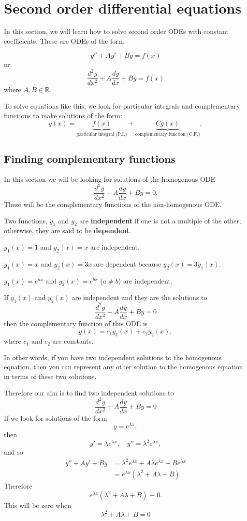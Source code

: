 \section{Second order differential equations}
In this section, we will learn how to solve second order ODEs with constant coefficients. These are ODEs of the form

\[y'' + Ay' + By = f(x)\] or \[\frac{d^2y}{dx^2} + A\frac{dy}{dx} + By = f(x)\] where \(A,B\in\mathbb{R}\).

To solve equations like this, we look for particular integrals and complementary functions to make solutions of the form:
\[y(x)=\underbrace{f(x)}_{\text{particular integral (P.I.)}}+\underbrace{Cg(x)}_{\text{complementary function (C.F.)}},\]

\subsection{Finding complementary functions}
In this section we will be looking for solutions of the homogenous ODE \[\frac{d^2y}{dx^2} + A\frac{dy}{dx} + By = 0.\]
These will be the complementary functions of the non-homogenous ODE.
\begin{definition}
Two functions, $y_1$ and $y_2$ are \textbf{independent} if one is not a multiple of the other; otherwise, they are said to be \textbf{dependent}.
\end{definition}

\begin{example}
$y_1(x)=1$ and $y_2(x)=x$ are independent.

$y_1(x)=x$ and $y_2(x)=3x$ are dependent because $y_2(x)=3y_1(x)$.

$y_1(x)=e^{ax}$ and $y_2(x)=e^{bx}$ ($a\ne b$) are independent.
\end{example}

\begin{theorem}
If $y_1(x)$ and $y_2(x)$ are independent and they are the solutions to
\[\frac{d^2y}{dx^2} + A\frac{dy}{dx} + By = 0\]
 then the complementary function of this ODE is
\[y(x)=c_1y_1(x)+c_2y_2(x),\]
where $c_1$ and $c_2$ are constants.

In other words, if you have two independent solutions to the homogenous equation, then you can represent any other solution to the homogenous
equation in terms of these two solutions.
\end{theorem}

Therefore our aim is to find two independent solutions to 
\[\frac{d^2y}{dx^2} + A\frac{dy}{dx} + By = 0\]
If we look for solutions of the form
\[y=e^{\lambda x},\]
then
\[y'=\lambda e^{\lambda x},\quad y''=\lambda^2e^{\lambda x},\]
and so
\begin{align*}
y''+Ay'+By&=\lambda^2e^{\lambda x}+A\lambda e^{\lambda x}+Be^{\lambda x}\\&=e^{\lambda x}(\lambda^2+A\lambda+B).
\end{align*}
Therefore
\[e^{\lambda x}(\lambda^2+A\lambda+B)\equiv0.\]
This will be zero when
\[\lambda^2+A\lambda+B=0\]

